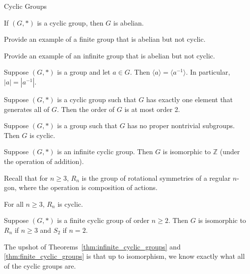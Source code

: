 \begin{section}{Cyclic Groups}
\begin{theorem}
If $(G,*)$ is a cyclic group, then $G$ is abelian.
\end{theorem}

\begin{exercise}
Provide an example of a finite group that is abelian but not cyclic.
\end{exercise}

\begin{exercise}
Provide an example of an infinite group that is abelian but not cyclic.
\end{exercise}

\begin{theorem}
Suppose $(G,*)$ is a group and let $a\in G$. Then $\langle a\rangle=\langle a^{-1}\rangle$. In particular, $|a|=|a^{-1}|$.
\end{theorem}

\begin{theorem}
Suppose $(G,*)$ is a cyclic group such that $G$ has exactly one element that generates all of $G$.  Then the order of $G$ is at most order 2.   
\end{theorem}

\begin{theorem}
Suppose $(G,*)$ is a group such that $G$ has no proper nontrivial subgroups.  Then $G$ is cyclic.
\end{theorem}

\begin{theorem}\label{thm:infinite_cyclic_groups}
Suppose $(G,*)$ is an infinite cyclic group.  Then $G$ is isomorphic to $\mathbb{Z}$ (under the operation of addition).
\end{theorem}

Recall that for $n\geq3$, $R_n$ is the group of rotational symmetries of a regular $n$-gon, where the operation is composition of actions.

\begin{theorem}
For all $n\geq 3$, $R_n$ is cyclic.
\end{theorem}

\begin{theorem}\label{thm:finite_cyclic_groups}
Suppose $(G,*)$ is a finite cyclic group of order $n\geq 2$.  Then $G$ is isomorphic to $R_n$ if $n\geq 3$ and $S_2$ if $n=2$.
\end{theorem}

The upshot of Theorems~\ref{thm:infinite_cyclic_groups} and \ref{thm:finite_cyclic_groups} is that up to isomorphism, we know exactly what all of the cyclic groups are.


\end{section}
